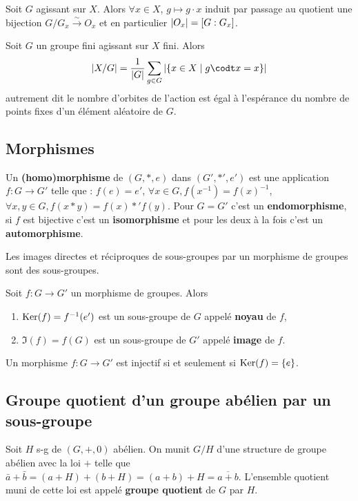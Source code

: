 	\begin{pop}
		Soit $G$ agissant sur $X$.
		Alors $\forall x \in X$, $g \mapsto g \cdot x$ induit par passage au quotient une bijection $G/G_x \overset{\sim}{\to} O_x$ et en particulier $\left\lvert O_x\right\rvert = [G : G_x]$.
	\end{pop}

	\begin{thm}
		Soit $G$ un groupe fini agissant sur $X$ fini.
		Alors
		$$\abs{X/G} = \frac{1}{\abs{G}} \sum_{g \in G} \abs{\{ x \in X \mid g \codt x = x \} }$$
		autrement dit le nombre d'orbites de l'action est égal à l'espérance du nombre de points fixes d'un élément aléatoire de $G$.
	\end{thm}


\subsection{Morphismes}

	\begin{defn}
		Un \textbf{(homo)morphisme} de $(G,*,e)$ dans $(G',*',e')$ est une application $f \colon G \to G'$ telle que : $f(e) = e'$, $\forall x \in G, f(x^{-1}) = f(x)^{-1}$, $\forall x,y \in G, f(x * y) = f(x) *' f(y)$.
		Pour $G = G'$ c'est un \textbf{endomorphisme}, si $f$ est bijective c'est un \textbf{isomorphisme} et pour les deux à la fois c'est un \textbf{automorphisme}.
	\end{defn}

	\begin{pop}
		Les images directes et réciproques de sous-groupes par un morphisme de groupes sont des sous-groupes.
	\end{pop}

	\begin{defn}
		Soit $f \colon G \to G'$ un morphisme de groupes.
		Alors
		\begin{enumerate}
			\item $\operatorname{Ker}(f) = f^{-1}(e')$ est un sous-groupe de $G$ appelé \textbf{noyau} de $f$,
			\item $\Im(f) = f(G)$ est un sous-groupe de $G'$ appelé \textbf{image} de $f$.
		\end{enumerate}
	\end{defn}

	\begin{pop}
		Un morphisme $f \colon G \to G'$ est injectif si et seulement si $\operatorname{Ker}(f) = \{ e \}$.
	\end{pop}


\subsection{Groupe quotient d'un groupe abélien par un sous-groupe}

	\begin{lem}
		Soit $H$ s-g de $(G,+,0)$ abélien.
		On munit $G/H$ d'une structure de groupe abélien avec la loi $+$ telle que $\bar{a} + \bar{b} = (a + H) + (b + H) = (a + b) + H = \overline{a + b}$.
		L'ensemble quotient muni de cette loi est appelé \textbf{groupe quotient} de $G$ par $H$.
	\end{lem}

